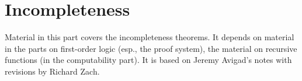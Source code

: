 \documentclass[../../include/open-logic-part]{subfiles}
\begin{document}
\part{Incompleteness}

\begin{editorial}
 Material in this part covers the incompleteness theorems. It depends
 on material in the parts on first-order logic (esp., the proof
 system), the material on recursive functions (in the computability
 part).  It is based on Jeremy Avigad's notes with revisions by Richard Zach.
\end{editorial}






\OLEndPartHook
\end{document}
